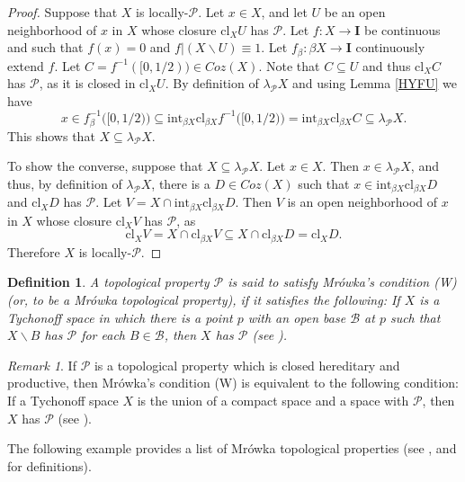 \documentclass{amsart}
\theoremstyle{definition}
\newtheorem{definition}[theorem]{Definition}
\theoremstyle{remark}
\newtheorem{remark}[theorem]{Remark}
\theoremstyle{notation}
\numberwithin{equation}{section}
\begin{document}
\begin{proof}
Suppose that $X$ is  locally-$\mathcal{P}$. Let $x\in X$, and let $U$ be an open neighborhood of $x$ in $X$ whose closure $\mbox{cl}_XU$ has
$\mathcal{P}$. Let $f:X\rightarrow \mathbf{I}$ be continuous and such that  $f(x)=0$ and $f|(X\backslash U)\equiv 1$. Let
$f_\beta:\beta X\rightarrow \mathbf{I}$ continuously extend $f$. Let $C=f^{-1}([0,1/2))\in Coz(X)$. Note that $C\subseteq U$ and thus $\mbox{cl}_XC$  has $\mathcal{P}$, as it is closed in $\mbox{cl}_XU$. By definition of
$\lambda_{{\mathcal P}} X$ and using Lemma \ref{HYFU} we have
\[x\in f_\beta^{-1}\big([0,1/2)\big)\subseteq\mbox{int}_{\beta X}\mbox{cl}_{\beta X}f^{-1}\big([0,1/2)\big)=\mbox{int}_{\beta X}\mbox{cl}_{\beta X}C\subseteq\lambda_{{\mathcal P}} X.\]
This shows that $X\subseteq\lambda_{{\mathcal P}} X$.

To show the  converse, suppose that  $X\subseteq\lambda_{{\mathcal P}} X$. Let $x\in X$. Then $x\in \lambda_{{\mathcal P}} X$, and thus, by definition of
$\lambda_{{\mathcal P}} X$, there is a $D\in Coz(X)$ such that $x\in \mbox{int}_{\beta X}\mbox{cl}_{\beta X}D$ and $\mbox{cl}_X D$ has $\mathcal{P}$.
Let $V=X\cap \mbox{int}_{\beta X}\mbox{cl}_{\beta X}D$. Then $V$ is an open neighborhood of $x$ in $X$ whose closure $\mbox{cl}_XV$ has $\mathcal{P}$, as
\[\mbox{cl}_XV= X\cap\mbox{cl}_{\beta X}V\subseteq X\cap\mbox{cl}_{\beta X}D=\mbox{cl}_X D.\]
Therefore $X$ is locally-$\mathcal{P}$.
\end{proof}

\begin{definition}\label{HGFB}
{\em A  topological
property  $\mathcal{P}$ is said to {\em satisfy  Mr\'{o}wka's condition} (W) (or, to {\em be a Mr\'{o}wka topological property}), if it satisfies the following: If $X$ is a Tychonoff
space in which there is a point  $p$ with an open  base  ${\mathscr B}$ at $p$ such that $X\backslash  B$ has $\mathcal{P}$ for
each $B\in{\mathscr B}$, then $X$ has $\mathcal{P}$ (see \cite{Mr}).}
\end{definition}

\begin{remark}
If $\mathcal{P}$ is  a topological property which is closed hereditary and productive, then  Mr\'{o}wka's condition (W) is equivalent to
the following condition:   If a Tychonoff  space $X$ is the union of a compact space and a space with $\mathcal{P}$,
then $X$ has $\mathcal{P}$ (see \cite{MRW1}).
\end{remark}

The following example  provides a list of  Mr\'{o}wka topological properties (see \cite{Bu}, \cite{Steph} and \cite{Va} for definitions).
\end{document}
